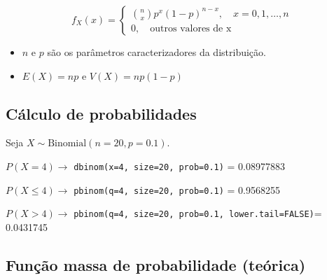 \documentclass[
]{book}
\begin{document}
\[f_{X}(x) = \begin{cases}
\binom{n}{x}p^{x}(1-p)^{n-x}, \quad x=0,1,\ldots,n \\
0, \quad \text{outros valores de x}
\end{cases}\]

\begin{itemize}
\item
  \(n\) e \(p\) são os parâmetros caracterizadores da distribuição.
\item
  \(E(X)=np\) e \(V(X)=np(1-p)\)
\end{itemize}

\subsection{Cálculo de probabilidades}\label{cuxe1lculo-de-probabilidades-6}

Seja \(X\sim\text{Binomial}(n=20, p=0.1)\).

\(P(X = 4) \to\) \texttt{dbinom(x=4,\ size=20,\ prob=0.1)} = 0.08977883

\noindent \(P(X\leq 4) \to\) \texttt{pbinom(q=4,\ size=20,\ prob=0.1)} = 0.9568255

\noindent \(P(X > 4)\to\)
\texttt{pbinom(q=4,\ size=20,\ prob=0.1,\ lower.tail=FALSE)}= 0.0431745

\subsection{Função massa de probabilidade (teórica)}\label{funuxe7uxe3o-massa-de-probabilidade-teuxf3rica-2}
\end{document}

